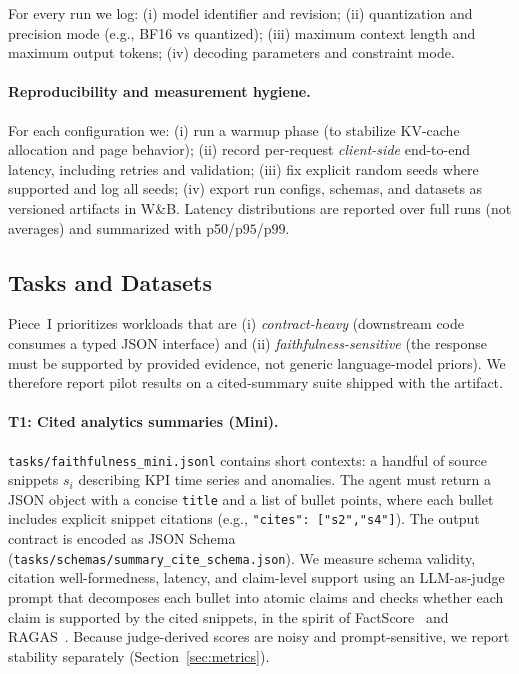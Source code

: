 \documentclass[11pt]{article}
\newcommand{\pninetyfive}{\ensuremath{\mathrm{p95}}}
\newcommand{\pninetynine}{\ensuremath{\mathrm{p99}}}
\begin{document}
For every run we log:
(i) model identifier and revision;
(ii) quantization and precision mode (e.g., BF16 vs quantized);
(iii) maximum context length and maximum output tokens;
(iv) decoding parameters and constraint mode.

\paragraph{Reproducibility and measurement hygiene.}
For each configuration we:
(i) run a warmup phase (to stabilize KV-cache allocation and page behavior);
(ii) record per-request \emph{client-side} end-to-end latency, including retries and validation;
(iii) fix explicit random seeds where supported and log all seeds;
(iv) export run configs, schemas, and datasets as versioned artifacts in W\&B.
Latency distributions are reported over full runs (not averages) and summarized with p50/\pninetyfive/\pninetynine.


\subsection{Tasks and Datasets}
\label{sec:tasks}

Piece~I prioritizes workloads that are (i) \emph{contract-heavy} (downstream code consumes a typed JSON interface) and (ii) \emph{faithfulness-sensitive} (the response must be supported by provided evidence, not generic language-model priors). We therefore report pilot results on a cited-summary suite shipped with the artifact.

\paragraph{T1: Cited analytics summaries (Mini).}
\texttt{tasks/faithfulness\_mini.jsonl} contains short contexts: a handful of source snippets $s_i$ describing KPI time series and anomalies. The agent must return a JSON object with a concise \texttt{title} and a list of bullet points, where each bullet includes explicit snippet citations (e.g., \texttt{"cites": ["s2","s4"]}). The output contract is encoded as JSON Schema (\texttt{tasks/schemas/summary\_cite\_schema.json}). We measure schema validity, citation well-formedness, latency, and claim-level support using an LLM-as-judge prompt that decomposes each bullet into atomic claims and checks whether each claim is supported by the cited snippets, in the spirit of FactScore~\citep{atomicFacts2024} and RAGAS~\citep{es2023ragas}. Because judge-derived scores are noisy and prompt-sensitive, we report stability separately (Section~\ref{sec:metrics}).
\end{document}

